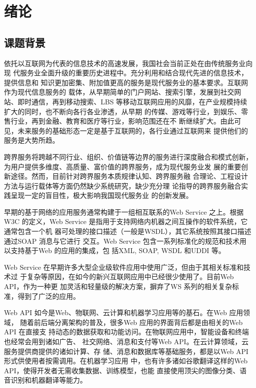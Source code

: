 \chapter{绪论}

\section{课题背景}

依托以互联网为代表的信息技术的高速发展，我国社会当前正处在由传统服务业向现
代服务业全面升级的重要历史进程中。充分利用和结合现代先进的信息技术，提供信息和
知识更加密集、附加值更高的服务是现代服务业的基本要求。互联网作为现代信息服务的
载体，从早期简单的门户网站、搜索引擎，发展到社交网站、即时通信，再到移动搜索、LBS
等移动互联网应用的风靡，在产业规模持续扩大的同时，也不断向各行各业渗透，从早期
的传媒、游戏等行业，到娱乐、零售行业，再到金融、教育和医疗等行业，影响范围还在不
断继续扩大\cite{王晓玲2015我国现代服务业借力}。由此可见，未来服务的基础形态一定是基于互联网的，各行业通过互联网来
提供他们的服务是大势所趋。

跨界服务将跨越不同行业、组织、价值链等边界的服务进行深度融合和模式创新，为用户提供多维度、高质量、富价值的跨界服务，成为现代服务业发
展的重要创新途径。然而，目前针对跨界服务本质规律认知、跨界服务融   
合理论、工程设计方法与运行载体等方面仍然缺少系统研究，缺少充分理
论指导的跨界服务融合实践呈现一定的盲目性，极大影响我国现代服务业
的创新发展。

早期的基于网络的应用服务通常构建于一组相互联系的Web Service 之上。根据W3C
的定义，Web Service 是指用于支持网络内机器之间互操作的软件系统，它通常包含一个机
器可处理的接口描述（一般是WSDL），其它系统按照其接口描述通过SOAP 消息与它进行
交互\cite{verborgh2018web}。Web Service 包含一系列标准化的规范和技术用以支持基于Web 的应用的集成，包
括XML, SOAP, WSDL 和UDDI 等。

Web Service 在早期许多大型企业级软件应用中使用广泛，但由于其相关标准和技术过
于复杂等原因，在如今的新兴互联网应用中已经很少使用了。目前Web API，作为一种更
加灵活和轻量级的解决方案，摒弃了WS 系列的相关复杂标准，得到了广泛的应用\cite{zaveri2017smartapi}。

Web API 如今是Web、物联网、云计算和机器学习应用等的基石\cite{tan2016service}。在Web 应用领域，
随着前后端分离架构的普及，很多Web 应用的界面背后都是由相关的Web API 在直接支
持动态的数据获取和功能访问。在物联网应用中，智能设备和终端也经常会用到诸如广告、
社交网络、消息和支付等Web API\cite{gorla2014checking,viennot2014measurement}。在云计算领域，云服务提供商提供的诸如计算、存
储、消息和数据库等基础服务，都是以Web API 形式供使用者按需调用。在机器学习应用
中，也有许多诸如谷歌翻译这样的Web API，使得开发者无需收集数据、训练模型，也能
直接使用顶尖的图像分类、语音识别和机器翻译等能力。

